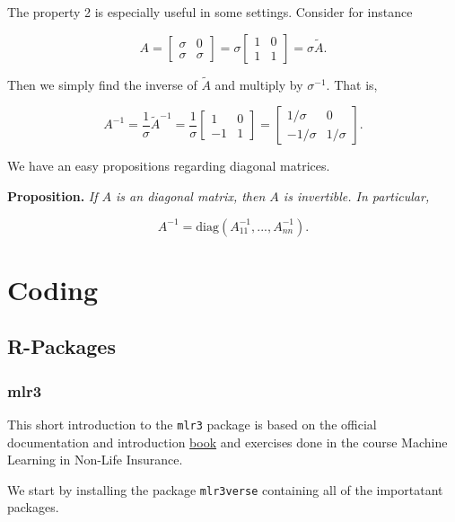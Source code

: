 \documentclass[
]{book}
\begin{document}
The property 2 is especially useful in some settings. Consider for instance

\[
A=
\begin{bmatrix}
\sigma & 0\\
\sigma & \sigma
\end{bmatrix}=\sigma\begin{bmatrix}
1 & 0\\
1 & 1
\end{bmatrix}=\sigma \tilde{A}.
\]

Then we simply find the inverse of \(\tilde{A}\) and multiply by \(\sigma^{-1}\). That is,

\[
A^{-1}=\frac{1}{\sigma}\tilde{A}^{-1}=\frac{1}{\sigma}
\begin{bmatrix}
1 & 0\\
-1 & 1
\end{bmatrix}=
\begin{bmatrix}
1/\sigma & 0\\
-1/\sigma & 1/\sigma
\end{bmatrix}.
\]

We have an easy propositions regarding diagonal matrices.

\textbf{Proposition.} \emph{If \(A\) is an diagonal matrix, then \(A\) is invertible. In particular,}

\[
A^{-1}=\text{diag}(A_{11}^{-1},...,A_{nn}^{-1}).
\]

\hypertarget{coding}{%
\chapter{Coding}\label{coding}}

\hypertarget{r-packages}{%
\section{R-Packages}\label{r-packages}}

\hypertarget{mlr3}{%
\subsection{mlr3}\label{mlr3}}

This short introduction to the \texttt{mlr3} package is based on the official documentation and introduction \href{https://mlr3book.mlr-org.com}{book} and exercises done in the course Machine Learning in Non-Life Insurance.

We start by installing the package \texttt{mlr3verse} containing all of the importatant packages.

\newpage

\printindex

  
\end{document}
